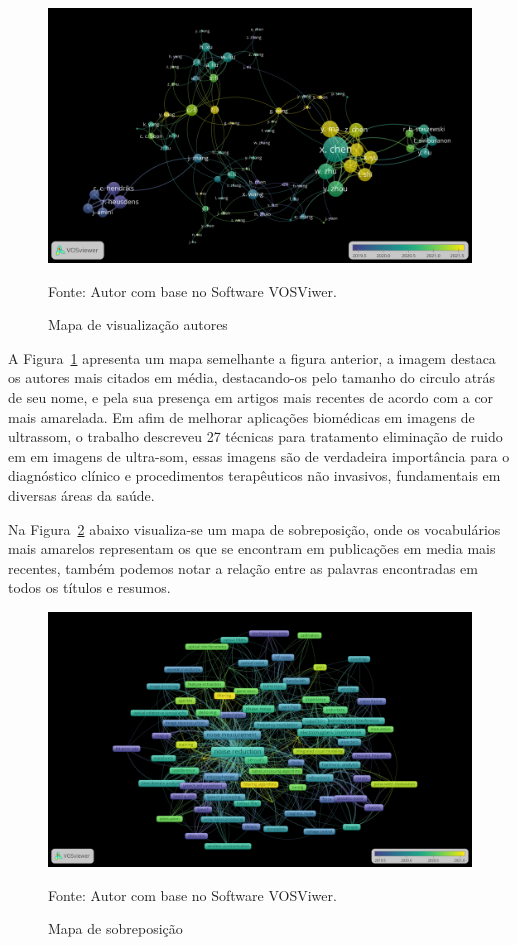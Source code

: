 \begin{figure}[H]
	\centering
	\includegraphics[width=15cm]{anexos/ris/IEEE/Noise_reduction_and_noise_abatement_andsensor_filtering_algorithm/overlay_visualization_cites.png}
	\caption{Mapa de visualização autores}
	Fonte: Autor com base no Software VOSViwer.
	\label{fig: overlay_visualization_cites}
\end{figure}

A Figura~\ref{fig: overlay_visualization_cites} apresenta um mapa semelhante a figura anterior, a imagem destaca os autores mais citados em média, destacando-os pelo tamanho do circulo atrás de seu nome, e pela sua presença em artigos mais recentes de acordo com a cor mais amarelada. 
Em \cite{duarte_speckle_noise} afim de melhorar aplicações biomédicas em imagens de ultrassom, o trabalho descreveu 27 técnicas para tratamento eliminação de ruido em em imagens de ultra-som, essas imagens são de verdadeira importância para o diagnóstico clínico e procedimentos terapêuticos não invasivos, fundamentais em diversas áreas da saúde.

Na Figura~\ref{fig: overlay_visualization} abaixo visualiza-se um mapa de sobreposição, onde os vocabulários mais amarelos representam os que se encontram em publicações em media mais recentes, também podemos notar a relação entre as palavras encontradas em todos os títulos e resumos. 

\begin{figure}[H]
	\centering
	\includegraphics[width=15cm]{anexos/ris/IEEE/Noise_reduction_and_noise_abatement_andsensor_filtering_algorithm/overlay_visualization.png}
	\caption{Mapa de sobreposição}
	Fonte: Autor com base no Software VOSViwer.
	\label{fig: overlay_visualization}
\end{figure}

